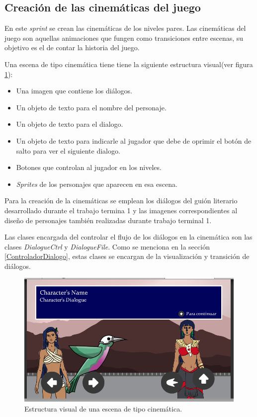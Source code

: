 \subsection{Creación de las cinemáticas del juego}
En este \textit{sprint} se crean las cinemáticas de los niveles pares. Las 
cinemáticas del juego son aquellas animaciones que fungen como transiciones 
entre escenas, su objetivo es el de contar la historia del juego.
\\
\par
Una escena de tipo cinemática tiene tiene la siguiente estructura visual(ver 
figura \ref{fig:Cinematica}):
	\begin{itemize}
		\item Una imagen que contiene  los diálogos.
		\item Un objeto de texto para el nombre del personaje.
		\item Un objeto de texto para el dialogo.
		\item Un objeto de texto para indicarle al jugador que debe de oprimir el 
		botón de salto para ver el siguiente dialogo.
		\item Botones que controlan al jugador en los niveles.
		\item \textit{Sprites} de los personajes que aparecen en esa escena. 
	\end{itemize}
Para la creación de la cinemáticas se emplean los diálogos del guión literario 
desarrollado durante el trabajo termina 1 y las imagenes correspondientes al 
diseño de personajes también realizadas durante trabajo terminal 1. 
\\
\par
Las clases encargada del controlar el flujo de los diálogos en la cinemática 
son las clases \textit{DialogueCtrl} y \textit{DialogueFile}. Como se menciona 
en la sección \ref{ControladorDialogo}, estas clases se encargan de la 
visualización y transición de diálogos.

\begin{figure}[h]
		\centering
		\includegraphics[height=0.3 \textheight]{03TrabajoRealizado/imagenes/cutscene.png}
		\caption{Estructura visual de una escena de tipo cinemática.}
		\label{fig:Cinematica}
\end{figure}

